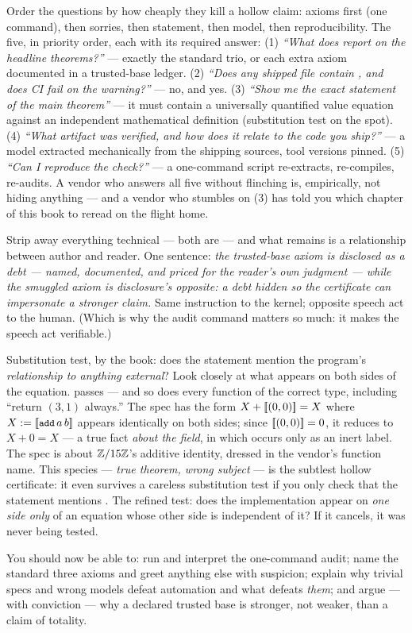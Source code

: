 \pathway Order the questions by how cheaply they kill a hollow claim:
axioms first (one command), then sorries, then statement, then model,
then reproducibility.
\answer The five, in priority order, each with its required answer:
(1) \emph{``What does  report on the headline
theorems?''} --- exactly the standard trio, or each extra axiom
documented in a trusted-base ledger. (2) \emph{``Does any shipped file
contain , and does CI fail on the warning?''} --- no, and
yes. (3) \emph{``Show me the exact statement of the main theorem''} ---
it must contain a universally quantified value equation against an
independent mathematical definition (substitution test on the spot).
(4) \emph{``What artifact was verified, and how does it relate to the
code you ship?''} --- a model extracted mechanically from the shipping
sources, tool versions pinned. (5) \emph{``Can I reproduce the check?''}
--- a one-command script re-extracts, re-compiles, re-audits. A vendor
who answers all five without flinching is, empirically, not hiding
anything --- and a vendor who stumbles on (3) has told you which chapter
of this book to reread on the flight home.

\pathway Strip away everything technical --- both are  ---
and what remains is a relationship between author and reader.
\answer One sentence: \emph{the trusted-base axiom is disclosed as a
debt --- named, documented, and priced for the reader's own judgment ---
while the smuggled axiom is disclosure's opposite: a debt hidden so the
certificate can impersonate a stronger claim.} Same instruction to the
kernel; opposite speech act to the human. (Which is why the audit
command matters so much: it makes the speech act verifiable.)

\pathway Substitution test, by the book: does the statement mention the
program's \emph{relationship to anything external}? Look closely at what
appears on both sides of the equation.
\answer {} passes --- and so does every function of the correct
type, including ``return $(3,1)$ always.'' The spec has the form
$X + [\mkern-3.3mu[ (0,0) ]\mkern-3.3mu] = X$ where $X := \denote{\code{add}\,a\,b}$ appears
identically on both sides; since $[\mkern-3.3mu[ (0,0) ]\mkern-3.3mu] = 0$, it reduces to
$X + 0 = X$ --- a true fact \emph{about the field}, in which 
occurs only as an inert label. The spec is about $\mathbb{Z}/15\mathbb{Z}$'s additive
identity, dressed in the vendor's function name. This species ---
\emph{true theorem, wrong subject} --- is the subtlest hollow
certificate: it even survives a careless substitution test if you only
check that the statement mentions . The refined test: does the
implementation appear on \emph{one side only} of an equation whose other
side is independent of it? If it cancels, it was never being tested.

\begin{checkpoint}
You should now be able to: run and interpret the one-command audit; name
the standard three axioms and greet anything else with suspicion; explain
why trivial specs and wrong models defeat automation and what defeats
\emph{them}; and argue --- with conviction --- why a declared trusted base
is stronger, not weaker, than a claim of totality.
\end{checkpoint}
